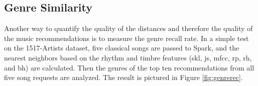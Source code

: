 \subsection{Genre Similarity}\label{genrerec}

Another way to quantify the quality of the distances and therefore the quality of the music recommendations is to measure the genre recall rate. In a simple test on the 1517-Artists dataset, five classical songs are passed to Spark, and the nearest neighbors based on the rhythm and timbre features (skl, js, mfcc, rp, rh, and bh) are calculated. Then the genres of the top ten recommendations from all five song requests are analyzed. The result is pictured in Figure \ref{fig:genrerec}.  

\begin{figure}[htbp]
	\centering
\end{figure}
